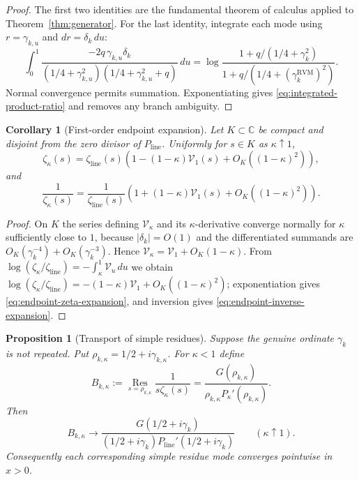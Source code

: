 \documentclass[11pt,reqno]{amsart}
\newtheorem{proposition}[theorem]{Proposition}
\newtheorem{corollary}[theorem]{Corollary}
\theoremstyle{definition}
\theoremstyle{remark}
\newcommand{\C}{\mathbb C}
\newcommand{\Res}{\operatorname*{Res}}
\newcommand{\RVM}{\mathrm{RVM}}
\newcommand{\linez}{\mathrm{line}}
\begin{document}
\begin{proof}
The first two identities are the fundamental theorem of calculus applied to Theorem~\ref{thm:generator}.  For the last identity, integrate each mode using $r=\gamma_{k,u}$ and $dr=\delta_k\,du$:
\[
 \int_0^1
 \frac{-2q\,\gamma_{k,u}\delta_k}
 {(1/4+\gamma_{k,u}^2)(1/4+\gamma_{k,u}^2+q)}\,du
 =\log\frac{1+q/(1/4+\gamma_k^2)}
 {1+q/(1/4+(\gamma_k^{\RVM})^2)}.
\]
Normal convergence permits summation.  Exponentiating gives \eqref{eq:integrated-product-ratio} and removes any branch ambiguity.
\end{proof}

\begin{corollary}[First-order endpoint expansion]\label{cor:endpoint-expansion}
Let $K\subset\C$ be compact and disjoint from the zero divisor of $P_{\linez}$.  Uniformly for $s\in K$ as $\kappa\uparrow1$,
\begin{equation}\label{eq:endpoint-zeta-expansion}
 \zeta_\kappa(s)=\zeta_{\linez}(s)
 \left(1-(1-\kappa)\mathcal V_1(s)+O_K((1-\kappa)^2)\right),
\end{equation}
and
\begin{equation}\label{eq:endpoint-inverse-expansion}
 \frac1{\zeta_\kappa(s)}=\frac1{\zeta_{\linez}(s)}
 \left(1+(1-\kappa)\mathcal V_1(s)+O_K((1-\kappa)^2)\right).
\end{equation}
\end{corollary}

\begin{proof}
On $K$ the series defining $\mathcal V_\kappa$ and its $\kappa$-derivative converge normally for $\kappa$ sufficiently close to $1$, because $|\delta_k|=O(1)$ and the differentiated summands are $O_K(\gamma_k^{-4})+O_K(\gamma_k^{-3})$.  Hence
$\mathcal V_\kappa=\mathcal V_1+O_K(1-\kappa)$.  From
$\log(\zeta_\kappa/\zeta_{\linez})=-\int_\kappa^1\mathcal V_u\,du$ we obtain
$\log(\zeta_\kappa/\zeta_{\linez})=-(1-\kappa)\mathcal V_1+O_K((1-\kappa)^2)$; exponentiation gives \eqref{eq:endpoint-zeta-expansion}, and inversion gives \eqref{eq:endpoint-inverse-expansion}.
\end{proof}

\begin{proposition}[Transport of simple residues]\label{prop:residues}
Suppose the genuine ordinate $\gamma_k$ is not repeated.  Put
$\rho_{k,\kappa}=1/2+i\gamma_{k,\kappa}$.  For $\kappa<1$ define
\begin{equation}\label{eq:residue-transport}
 B_{k,\kappa}
 :=\Res_{s=\rho_{k,\kappa}}
 \frac{1}{s\zeta_\kappa(s)}
 =\frac{G(\rho_{k,\kappa})}
 {\rho_{k,\kappa}P_\kappa'(\rho_{k,\kappa})}.
\end{equation}
Then
\begin{equation}
 B_{k,\kappa}\longrightarrow
 \frac{G(1/2+i\gamma_k)}
 {(1/2+i\gamma_k)P_{\linez}'(1/2+i\gamma_k)}
 \qquad(\kappa\uparrow1).
\end{equation}
Consequently each corresponding simple residue mode converges pointwise in $x>0$.
\end{proposition}
\end{document}
